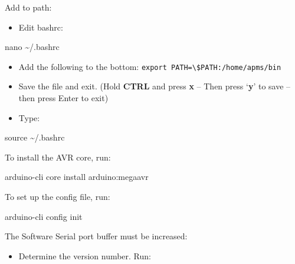 \documentclass[
  letterpaper,
]{scrbook}
\newenvironment{Shaded}{\begin{snugshade}}{\end{snugshade}}
\newcommand{\BuiltInTok}[1]{\textcolor[rgb]{0.00,0.23,0.31}{#1}}
\newcommand{\ExtensionTok}[1]{\textcolor[rgb]{0.00,0.23,0.31}{#1}}
\newcommand{\FunctionTok}[1]{\textcolor[rgb]{0.28,0.35,0.67}{#1}}
\newcommand{\NormalTok}[1]{\textcolor[rgb]{0.00,0.23,0.31}{#1}}
\providecommand{\tightlist}{%
  \setlength{\itemsep}{0pt}\setlength{\parskip}{0pt}}
\begin{document}
Add to path:

\begin{itemize}
\tightlist
\item
  Edit bashrc:
\end{itemize}

\begin{Shaded}
\begin{Highlighting}[]
\FunctionTok{nano}\NormalTok{ \textasciitilde{}/.bashrc}
\end{Highlighting}
\end{Shaded}

\begin{itemize}
\item
  Add the following to the bottom:
  \texttt{export\ PATH=\textbackslash{}\$PATH:/home/apms/bin}
\item
  Save the file and exit. (Hold \textbf{CTRL} and press \textbf{x} --
  Then press `\textbf{y}' to save -- then press Enter to exit)
\item
  Type:
\end{itemize}

\begin{Shaded}
\begin{Highlighting}[]
\BuiltInTok{source}\NormalTok{ \textasciitilde{}/.bashrc}
\end{Highlighting}
\end{Shaded}

To install the AVR core, run:

\begin{Shaded}
\begin{Highlighting}[]
\ExtensionTok{arduino{-}cli}\NormalTok{ core install arduino:megaavr}
\end{Highlighting}
\end{Shaded}

To set up the config file, run:

\begin{Shaded}
\begin{Highlighting}[]
\ExtensionTok{arduino{-}cli}\NormalTok{ config init}
\end{Highlighting}
\end{Shaded}

The Software Serial port buffer must be increased:

\begin{itemize}
\tightlist
\item
  Determine the version number. Run:
\end{itemize}
\end{document}
